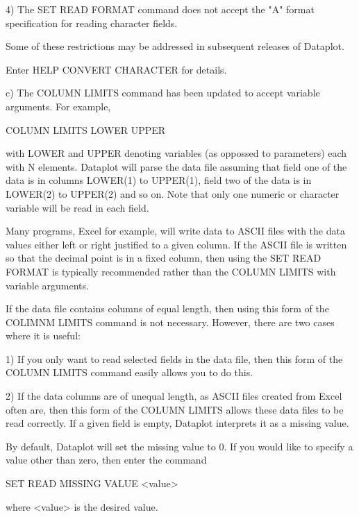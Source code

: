 {          4) The SET READ FORMAT command does not accept the
             "A" format specification for reading character
             fields.

       Some of these restrictions may be addressed in subsequent
       releases of Dataplot.

       Enter HELP CONVERT CHARACTER for details.

    c) The COLUMN LIMITS command has been updated to accept
       variable arguments.  For example,

            COLUMN LIMITS  LOWER  UPPER

       with LOWER and UPPER denoting variables (as oppossed to
       parameters) each with N elements.  Dataplot will parse
       the data file assuming that field one of the data is in
       columns LOWER(1) to UPPER(1), field two of the data is
       in LOWER(2) to UPPER(2) and so on.  Note that only one
       numeric or character variable will be read in each field.

       Many programs, Excel for example, will write data to ASCII
       files with the data values either left or right justified
       to a given column.  If the ASCII file is written so that
       the decimal point is in a fixed column, then using the
       SET READ FORMAT is typically recommended rather than
       the COLUMN LIMITS with variable arguments.
       
       If the data file contains columns of equal length, then
       using this form of the COLIMNM LIMITS command is not
       necessary.  However, there are two cases where it is useful:

          1) If you only want to read selected fields in the data
             file, then this form of the COLUMN LIMITS command
             easily allows you to do this.

          2) If the data columns are of unequal length, as ASCII
             files created from Excel often are, then this form
             of the COLUMN LIMITS allows these data files to be
             read correctly. If a given field is empty, Dataplot
             interprets it as a missing value.

             By default, Dataplot will set the missing value to 0. 
             If you would like to specify a value other than zero,
             then enter the command

                SET READ MISSING VALUE  <value>

             where <value> is the desired value.

}
